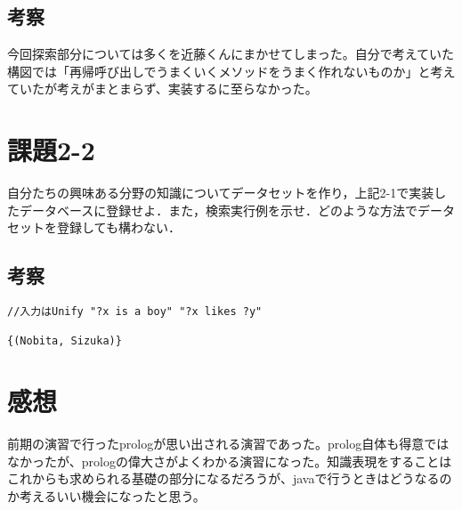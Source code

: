 \documentclass[a4j]{jarticle}
\begin{document}
\subsection{考察}
今回探索部分については多くを近藤くんにまかせてしまった。自分で考えていた構図では「再帰呼び出しでうまくいくメソッドをうまく作れないものか」と考えていたが考えがまとまらず、実装するに至らなかった。


\section{課題2-2}
\begin{screen}
  自分たちの興味ある分野の知識についてデータセットを作り，上記2-1で実装したデータベースに登録せよ．また，検索実行例を示せ．どのような方法でデータセットを登録しても構わない．
\end{screen}

\subsection{考察}
\begin{lstlisting}
//入力はUnify "?x is a boy" "?x likes ?y"

{(Nobita, Sizuka)}

\end{lstlisting}


\section{感想}
前期の演習で行ったprologが思い出される演習であった。prolog自体も得意ではなかったが、prologの偉大さがよくわかる演習になった。知識表現をすることはこれからも求められる基礎の部分になるだろうが、javaで行うときはどうなるのか考えるいい機会になったと思う。
\end{document}
